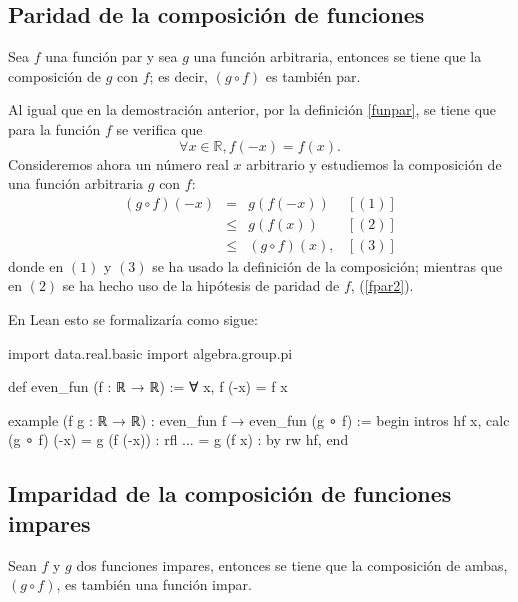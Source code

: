 \subsection{Paridad de la composición de funciones}

\begin{teorema}
  Sea \(f\) una función par y sea \(g\) una función arbitraria, entonces
  se tiene que la composición de \(g\) con \(f\); es decir, \((g ∘ f)\)
  es también par.
\end{teorema}

\begin{demostracion}
  Al igual que en la demostración anterior, por la definición
  \ref{funpar}, se tiene que para la función \(f\) se verifica que
  \begin{equation}\label{fpar2}
     ∀ x ∈ ℝ, f(-x) = f(x).
  \end{equation}
  Consideremos ahora un número real \(x\) arbitrario y estudiemos la
  composición de una función arbitraria \(g\) con \(f\):
  \[\begin{array}{llll}
      (g ∘ f)(-x) &= &g(f(-x))    & [(1)]\\
                  &≤ &g(f(x))     & [(2)] \\
                  &≤ &(g ∘ f)(x), & [(3)]
    \end{array}\]
  donde en \((1)\) y \((3)\) se ha usado la definición de la
  composición; mientras que en \((2)\) se ha hecho uso de la hipótesis
  de paridad de \(f\), (\ref{fpar2}).
\end{demostracion}

En Lean esto se formalizaría como sigue:
\begin{leancode}
import data.real.basic
import algebra.group.pi

def even_fun (f : ℝ → ℝ) := ∀ x, f (-x) = f x

example (f g : ℝ → ℝ) : even_fun f → even_fun (g ∘ f) :=
begin
  intros hf x,
  calc (g ∘ f) (-x)
      = g (f (-x)) : rfl
  ... = g (f x)    : by rw hf,
end
\end{leancode}


\subsection{Imparidad de la composición de funciones impares}

\begin{teorema}
  Sean \(f\) y \(g\) dos funciones impares, entonces se tiene que la
  composición de ambas, \((g ∘ f)\), es también una función impar.
\end{teorema}

